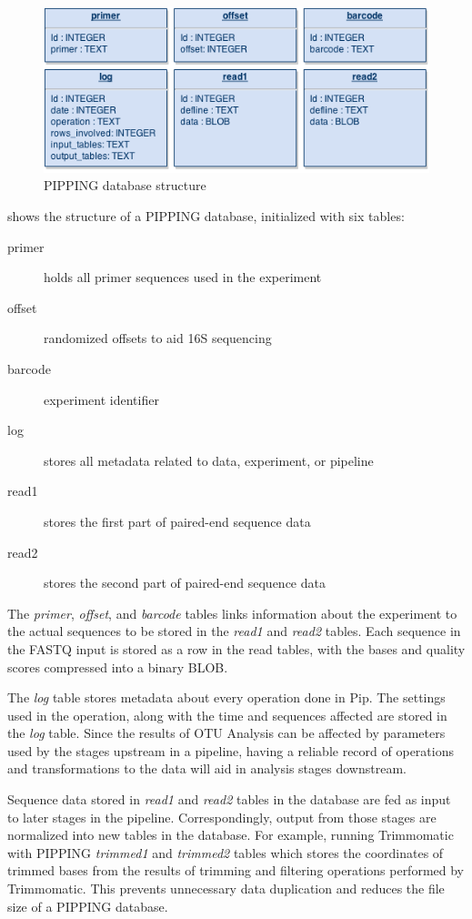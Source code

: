 \documentclass[12pt]{article}
\begin{document}
	\begin{figure}[h!]
		\centering
		\includegraphics[width=\textwidth]{db_structure}
		\caption{PIPPING database structure}
		\label{fig:db_structure}
	\end{figure}
	 shows the structure of a PIPPING database, 
	initialized with six tables:
	
	\begin{description}
		\item[primer] holds all primer sequences used in the experiment
		\item[offset] randomized offsets to aid 16S sequencing
		\item[barcode] experiment identifier
		\item[log] stores all metadata related to data, experiment, or pipeline
		\item[read1] stores the first part of paired-end sequence data
		\item[read2] stores the second part of paired-end sequence data
	\end{description}
	
	The \emph{primer}, \emph{offset}, and \emph{barcode} tables links information 
	about the experiment to the actual sequences to be stored in the \emph{read1} 
	and \emph{read2} tables. Each sequence in the FASTQ input is stored as a row in 
	the read tables, with the bases and quality scores compressed into a binary BLOB.
	
	The \emph{log} table stores metadata about every 
	operation done in Pip. The settings used in the operation, along with the time and sequences affected
	are stored in the \emph{log} table. Since the results of OTU Analysis can be 
	affected by parameters used by the stages upstream in a pipeline, having a 
	reliable record of operations and transformations to the data will aid in 
	analysis stages downstream.
	
	Sequence data stored in \emph{read1} and \emph{read2} tables in the database are fed as input 
	to later stages in the pipeline. Correspondingly, output from those stages are 
	normalized into new tables in the database. For example, running Trimmomatic with 
	PIPPING \emph{trimmed1} and \emph{trimmed2} tables which stores the coordinates 
	of trimmed bases from the results of trimming and filtering operations performed by Trimmomatic. 
	This prevents unnecessary data duplication and reduces the file size of a PIPPING 
	database.
\end{document}
